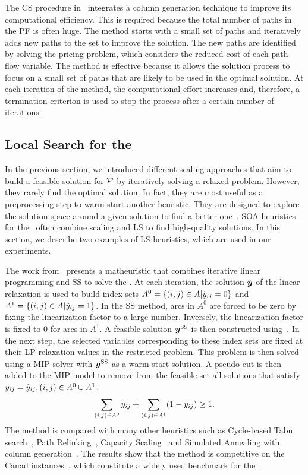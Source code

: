 \documentclass[3p, authoryear, times, doubleblind]{elsarticle}
\begin{document}
{The CS procedure in~\cite{katayama_capacity_2009} integrates a column generation technique to improve its computational efficiency. This is required because the total number of paths in the PF is often huge. The method starts with a small set of paths and iteratively adds new paths to the set to improve the solution. The new paths are identified by solving the pricing problem, which considers the reduced cost of each path flow variable. The method is effective because it allows the solution process to focus on a small set of paths that are likely to be used in the optimal solution. At each iteration of the method, the computational effort increases and, therefore, a termination criterion is used to stop the process after a certain number of iterations. 


\subsection{Local Search for the \fcn} 
In the previous section, we introduced different scaling approaches that aim to build a feasible solution for $\mathcal{P}$  by iteratively solving a relaxed problem. However, they rarely find the optimal solution. In fact, they are most useful as a preprocessing step to warm-start another heuristic. They are designed to explore the solution space around a given solution to find a better one~\citep{shaw_using_1998}. SOA heuristics for the \fcn~often combine scaling and LS to find high-quality solutions. In this section, we describe two examples of LS heuristics, which are used in our experiments. 

The work from~\cite{gendron_matheuristics_2018} presents a matheuristic that combines iterative linear programming and SS to solve the \fcn. At each iteration, the solution $\tilde{\boldsymbol{y}}$ of the linear relaxation is used to build index sets $A^0 = \{(i,j)\in A| \tilde{y}_{ij} = 0\}$ and $A^1 = \{(i,j)\in A| \tilde{y}_{ij} = 1\}$. In the SS method, arcs in $A^0$ are forced to be zero by fixing the linearization factor to a large number. Inversely, the linearization factor is fixed to 0 for arcs in $A^1$. A feasible solution $\boldsymbol{y}^{\text{SS}}$ is then constructed using~. In the next step, the selected variables corresponding to these index sets are fixed at their LP relaxation values in the restricted problem. This problem is then solved using a MIP solver with $\boldsymbol{y}^{\text{SS}}$ as a warm-start solution.  A pseudo-cut is then added to the MIP model to remove from the feasible set all solutions that satisfy $y_{ij} = \tilde{y}_{ij}, (i,j) \in A^0 \cup A^1$: 
\begin{align}
    \sum_{(i,j) \in A^0} y_{ij} + \sum_{(i,j) \in A^1} (1-y_{ij}) \geq 1.
\end{align} 
The method is compared with many other heuristics such as Cycle-based Tabu search~\citep{ghamlouche_cycle-based_2003}, Path Relinking~\citep{ghamlouche_path_2004}, Capacity Scaling~\citep{katayama_capacity_2009} and Simulated Annealing with column generation~\citep{yaghini_hybrid_2013}. The results show that the method is competitive on the Canad instances~\citep{crainic_bundle-based_2001}, which constitute a widely used benchmark for the \fcn. 

}
\end{document}
